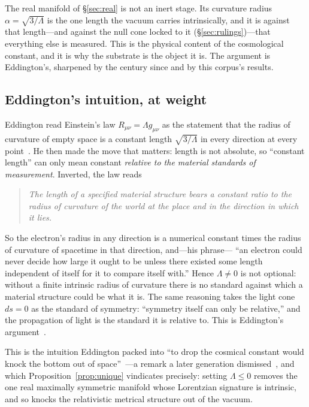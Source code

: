 \documentclass[11pt,a4paper]{article}
\theoremstyle{definition}
\begin{document}
The real manifold of \S\ref{sec:real} is not an inert stage. Its curvature
radius $\alpha=\sqrt{3/\Lambda}$ is the one length the vacuum carries
intrinsically, and it is against that length---and against the null cone
locked to it (\S\ref{sec:rulings})---that everything else is measured. This
is the physical content of the cosmological constant, and it is why the
substrate is the object it is. The argument is Eddington's, sharpened by
the century since and by this corpus's results.

\subsection{Eddington's intuition, at weight}

Eddington read Einstein's law $R_{\mu\nu}=\Lambda g_{\mu\nu}$ as the
statement that the radius of curvature of empty space is a constant length
$\sqrt{3/\Lambda}$ in every direction at every
point~\cite{Eddington1923}. He then made the move that matters: length is
not absolute, so ``constant length'' can only mean constant \emph{relative
to the material standards of measurement}. Inverted, the law reads
\begin{quote}
\emph{The length of a specified material structure bears a constant ratio
to the radius of curvature of the world at the place and in the direction
in which it lies.}
\end{quote}
So the electron's radius in any direction is a numerical constant times the
radius of curvature of spacetime in that direction, and---his phrase---%
``an electron could never decide how large it ought to be unless there
existed some length independent of itself for it to compare itself with.''
Hence $\Lambda\neq0$ is not optional: without a finite intrinsic radius of
curvature there is no standard against which a material structure could be
what it is. The same reasoning takes the light cone $ds=0$ as the standard
of symmetry: ``symmetry itself can only be relative,'' and the propagation
of light is the standard it is relative to. This is Eddington's argument~\cite{Eddington1923}.

This is the intuition Eddington packed into ``to drop the cosmical constant
would knock the bottom out of space''~\cite{Eddington1933}---a remark a
later generation dismissed~\cite{Chandrasekhar1983}, and which
Proposition~\ref{prop:unique} vindicates precisely: setting $\Lambda\le0$
removes the one real maximally symmetric manifold whose Lorentzian
signature is intrinsic, and so knocks the relativistic metrical structure
out of the vacuum.
\end{document}
